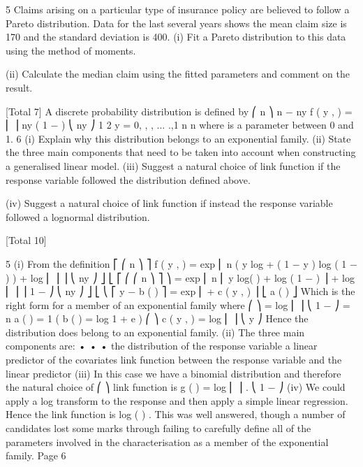 \documentclass[a4paper,12pt]{article}
\begin{document}
5
Claims arising on a particular type of insurance policy are believed to follow a Pareto
distribution. Data for the last several years shows the mean claim size is 170 and the
standard deviation is 400.
(i) Fit a Pareto distribution to this data using the method of moments.

(ii) Calculate the median claim using the fitted parameters and comment on the
result.

[Total 7]
A discrete probability distribution is defined by
⎛ n ⎞
n − ny
f ( y , \mu  ) = ⎜ ⎟ \mu  ny ( 1 − \mu  )
⎝ ny ⎠
1 2
y = 0, , , ... .,1
n n
where \mu  is a parameter between 0 and 1.
6
(i) Explain why this distribution belongs to an exponential family. 
(ii) State the three main components that need to be taken into account when
constructing a generalised linear model. 
(iii) Suggest a natural choice of link function if the response variable followed the
distribution defined above.

(iv) Suggest a natural choice of link function if instead the response variable
followed a lognormal distribution.

[Total 10]




5
(i)
From the definition
⎡
⎛ n ⎞ ⎤
f ( y , \mu  ) = exp ⎢ n ( y log \mu  + ( 1 − y ) log ( 1 − \mu  ) ) + log ⎜ ⎟ ⎥
⎝ ny ⎠ ⎦
⎣
⎡ ⎛
⎛ n ⎞ ⎤
⎞
\mu 
= exp ⎢ n ⎜ y log(
) + log ( 1 − \mu  ) ⎟ + log ⎜ ⎟ ⎥
1 − \mu 
⎠
⎝ ny ⎠ ⎦
⎣ ⎝
⎡ y \theta  − b ( \theta  )
⎤
= exp ⎢
+ c ( y , \Phi ) ⎥
⎣ a ( \Phi )
⎦
Which is the right form for a member of an exponential family where
⎛ \mu  ⎞
\theta  = log ⎜
⎟
⎝ 1 − \mu  ⎠
\Phi= n
a ( \Phi ) =
1
\Phi
(
b ( \theta  ) = log 1 + e \theta 
)
⎛ \Phi ⎞
c ( y , \Phi ) = log ⎜ ⎟
⎝ \Phi y ⎠
Hence the distribution does belong to an exponential family.
(ii)
The three main components are:
•
•
•
the distribution of the response variable
a linear predictor of the covariates
link function between the response variable and the linear predictor
(iii) In this case we have a binomial distribution and therefore the natural choice of
⎛ \mu  ⎞
link function is g ( \mu  ) = log ⎜
⎟ .
⎝ 1 − \mu  ⎠
(iv) We could apply a log transform to the response and then apply a simple linear
regression. Hence the link function is log ( \mu  ) .
This was well answered, though a number of candidates lost some marks through failing to
carefully define all of the parameters involved in the characterisation as a member of the
exponential family.
Page 6%
\end{document}
